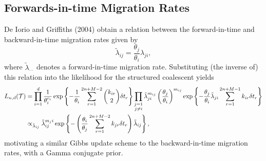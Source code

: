 \subsection{Forwards-in-time Migration Rates}
	De Iorio and Griffiths (2004) obtain a relation between the forward-in-time and backward-in-time migration rates given by
		\[
			\tilde{\lambda}_{ij} = \frac{\theta_j}{\theta_i} \lambda_{ji},
		\]
	where $\tilde{\lambda}_{\cdot \cdot}$ denotes a forward-in-time migration rate. Substituting (the inverse of) this relation into the likelihood for the structured coalescent yields
		\begin{align*}
			L_{n,d}(\mathcal{T}) & = \prod_{i=1}^d \frac{1}{\theta_i^{c_i}} \exp \left\{ -\frac{1}{\theta_i} \sum_{r = 1}^{2n + M - 2} \binom{k_{ir}}{2} \delta t_r \right\} \prod_{\substack{j=1 \\ j \neq i}} \tilde{\lambda}_{ji}^{m_{ij}} \left(\frac{\theta_j}{\theta_i} \right)^{m_{ij}} \exp \left\{ - \frac{\theta_j}{\theta_i} \tilde{\lambda}_{ji} \sum_{r=1}^{2n+M-1} k_{i r} \delta t_r \right\} \\
				& \propto_{\tilde{\lambda}_{ij}} \tilde{\lambda}_{ij}^{m_ji} \exp \left\{ - \left( \frac{\theta_i}{\theta_j} \sum_{r = 1}^{2n + M - 2} k_{jr} \delta t_r \right) \tilde{\lambda}_{ij} \right\},
		\end{align*}
	motivating a similar Gibbs update scheme to the backward-in-time migration rates, with a Gamma conjugate prior.

